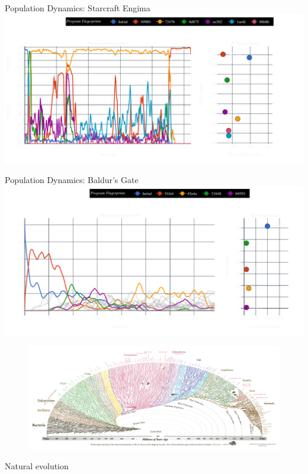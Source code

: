 \documentclass[aspectratio=169]{beamer}
\makeatletter
\renewcommand{\emph}[1]{{\Huge \color{pureminimalistic@text@red} #1}}
\makeatother
\begin{document}
\begin{frame}{Population Dynamics: Starcraft Engima}
    \includegraphics[width=1.0\linewidth, keepaspectratio]{figures/pheno.pdf}
\end{frame}

\begin{frame}{Population Dynamics: Baldur's Gate}
    \includegraphics[width=1.0\linewidth, keepaspectratio]{figures/baldurs_pheno_60.pdf}
\end{frame}

{
\begin{frame}[plain]
  \begin{figure}
  \centering
  \includegraphics[width=1.0\linewidth,keepaspectratio]{figures/tree_of_life.png}
  \end{figure}
  \begin{center}
      \emph{Natural evolution}
  \end{center}
\end{frame}
}
\end{document}
